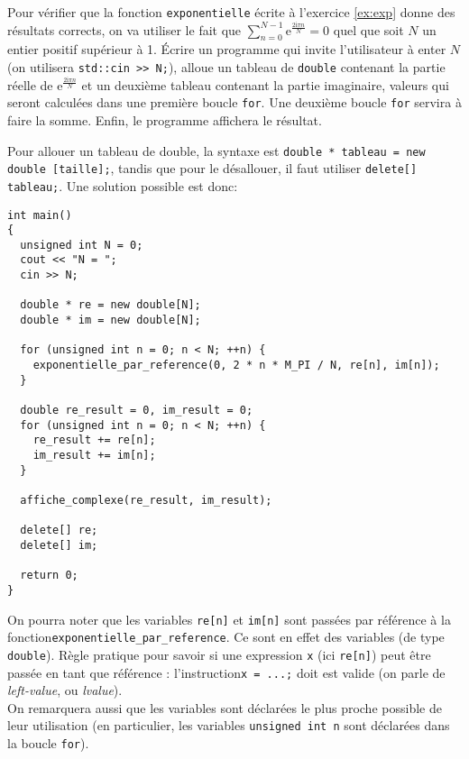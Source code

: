 \documentclass{book}
\newcommand{\inline}[1]{\texttt{#1}}
\begin{document}
Pour vérifier que la fonction \inline{exponentielle} écrite à l'exercice \ref{ex:exp} donne des résultats corrects, on va utiliser le fait que $\sum_{n=0}^{N-1} 
\mathrm{e}^{\frac{2\mathrm{i}\pi n}{N}} = 0$ quel que soit $N$ un entier positif supérieur à 1. Écrire un programme qui invite l'utilisateur à enter $N$ (on utilisera \inline{std::cin >> N;}), alloue un tableau de \inline{double} contenant la partie réelle de 
$\mathrm{e}^{\frac{2\mathrm{i}\pi n}{N}}$ et un  deuxième tableau contenant la partie imaginaire, valeurs qui seront calculées dans une première boucle \inline{for}. Une deuxième 
boucle \inline{for} servira à faire la somme. Enfin, le programme affichera le résultat.

\begin{correction}
Pour allouer un tableau de double, la syntaxe est \inline{double * tableau = new double [taille];}, tandis que pour le désallouer, il faut utiliser 
\inline{delete[] tableau;}. Une solution possible est donc:
\begin{verbatim}
int main() 
{
  unsigned int N = 0;
  cout << "N = ";
  cin >> N;

  double * re = new double[N];
  double * im = new double[N];

  for (unsigned int n = 0; n < N; ++n) {
    exponentielle_par_reference(0, 2 * n * M_PI / N, re[n], im[n]);
  }

  double re_result = 0, im_result = 0;
  for (unsigned int n = 0; n < N; ++n) {
    re_result += re[n];
    im_result += im[n];
  }

  affiche_complexe(re_result, im_result);

  delete[] re;
  delete[] im;

  return 0;
}
\end{verbatim}

On pourra noter que les variables \inline{re[n]} et \inline{im[n]} sont passées par référence à la fonction\linebreak \inline{exponentielle_par_reference}. Ce sont en effet des variables (de type \inline{double}). Règle pratique pour savoir si une expression \inline{x} (ici \inline{re[n]}) peut être passée en tant que référence : l'instruction\linebreak \inline{x = ...;} doit est valide (on parle de \textit{left-value}, ou \textit{lvalue}).\\

On remarquera aussi que les variables sont déclarées le plus proche possible de leur utilisation (en particulier, les variables \inline{unsigned int n} sont déclarées dans la boucle \inline{for}). 
\end{correction}
\end{document}
